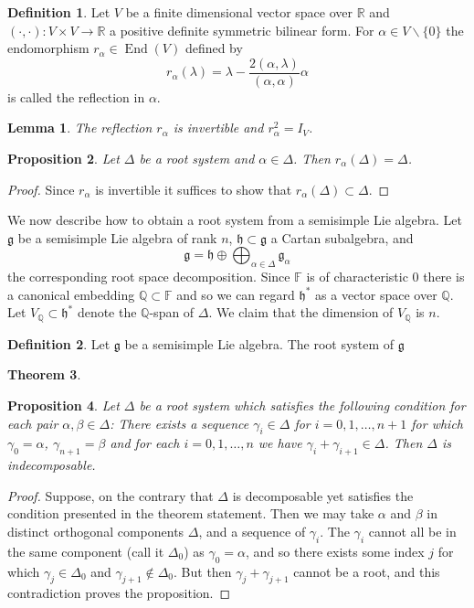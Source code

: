 \documentclass[12pt]{article}
\theoremstyle{plain}
\newtheorem{thm}{Theorem}[section]
\newtheorem{lemma}[thm]{Lemma}
\newtheorem{prop}[thm]{Proposition}
\theoremstyle{definition}
\newtheorem{defn}{Definition}[section]
\numberwithin{equation}{section}
\DeclareMathOperator{\en}{End}
\newcommand{\al}{\alpha}
\newcommand{\la}{\lambda}
\newcommand{\D}{\Delta}
\newcommand{\F}{\mathbb{F}}
\newcommand{\Q}{\mathbb{Q}}
\newcommand{\R}{\mathbb{R}}
\newcommand{\g}{\mathfrak{g}}
\newcommand{\h}{\mathfrak{h}}
\begin{document}
\begin{defn}
Let $V$ be a finite dimensional vector space over $\R$ and $(\cdot, \cdot) : V \times V \rightarrow \R$ a positive definite symmetric bilinear form. For $\al \in V \backslash \{0\}$ the endomorphism $r_\al \in \en(V)$ defined by
\[
r_\al(\la) = \la - \frac{2(\al, \la)}{(\al, \al)} \al
\]
is called the reflection in $\al$.
\end{defn}

\begin{lemma}
The reflection $r_\al$ is invertible and $r_\al^2 = I_V$.
\end{lemma}

\begin{prop}
Let $\D$ be a root system and $\al \in \D$. Then $r_\al(\D) = \D$.
\end{prop}

\begin{proof}
Since $r_\al$ is invertible it suffices to show that $r_\al(\D) \subset \D$.
\end{proof}



We now describe how to obtain a root system from a semisimple Lie algebra. Let $\g$ be a semisimple Lie algebra of rank $n$, $\h \subset \g$ a Cartan subalgebra, and
\[
\g = \h \oplus \bigoplus_{\al \in \D} \g_\al
\]
the corresponding root space decomposition. Since $\F$ is of characteristic $0$ there is a canonical embedding $\Q \subset \F$ and so we can regard $\h^*$ as a vector space over $\Q$. Let $V_\Q \subset \h^*$ denote the $\Q$-span of $\D$. We claim that the dimension of $V_\Q$ is $n$.

\begin{defn}
Let $\g$ be a semisimple Lie algebra. The root system of $\g$
\end{defn}


\begin{thm}

\end{thm}



\begin{prop}
Let $\D$ be a root system which satisfies the following condition for each pair $\al, \beta \in \D$: There exists a sequence $\gamma_i \in \D$ for $i = 0, 1, \ldots, n+1$ for which $\gamma_0 = \al$, $\gamma_{n+1} = \beta$ and for each $i = 0, 1, \ldots, n$ we have $\gamma_i + \gamma_{i+1} \in \D$. Then $\D$ is indecomposable.
\end{prop}

\begin{proof}
Suppose, on the contrary that $\D$ is decomposable yet satisfies the condition presented in the theorem statement. Then we may take $\al$ and $\beta$ in distinct orthogonal components $\D$, and a sequence of $\gamma_i$. The $\gamma_i$ cannot all be in the same component (call it $\D_0$) as $\gamma_0 = \al$, and so there exists some index $j$ for which $\gamma_j \in \D_0$ and $\gamma_{j+1} \notin \D_0$. But then $\gamma_j + \gamma_{j+1}$ cannot be a root, and this contradiction proves the proposition.
\end{proof}
\end{document}
